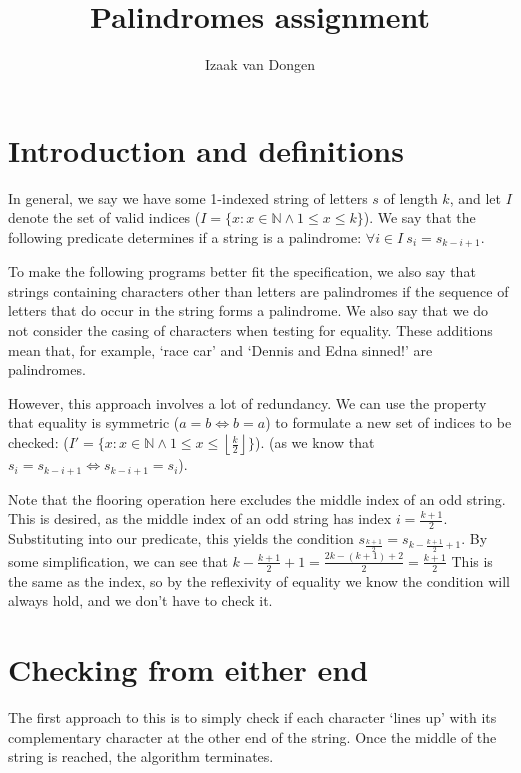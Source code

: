 \documentclass[fleqn,a4paper,11pt]{article}
\title{Palindromes assignment}
\author{Izaak van Dongen}
\begin{document}
    \maketitle
    \tableofcontents

    \section{Introduction and definitions}

    In general, we say we have some 1-indexed string of letters \(s\) of length
    \(k\), and let \(I\) denote the set of valid indices
    (\(I = \{x: x \in \mathbb{N} \land 1 \leq x \leq k\}\)).
    We say that the following predicate determines if a string is a palindrome:
    \( \forall i \in I\ s_i = s_{k - i + 1} \).

    To make the following programs better fit the specification, we also say
    that strings containing characters other than letters are palindromes if
    the sequence of letters that do occur in the string forms a palindrome. We
    also say that we do not consider the casing of characters when testing for
    equality. These additions mean that, for example, `race car' and `Dennis
    and Edna sinned!' are palindromes.

    However, this approach involves a lot of redundancy. We can use the
    property that equality is symmetric (\(a = b \iff b = a\)) to formulate a new
    set of indices to be checked:
    (\(I' = \{x: x \in \mathbb{N} \land 1 \leq x \leq
        \left\lfloor \frac{k}{2} \right\rfloor\}\)).
    (as we know that \( s_i = s_{k - i + 1} \iff s_{k - i + 1} = s_i \)).

    Note that the flooring operation here excludes the middle index of an odd
    string. This is desired, as the middle index of an odd string has index
    \( i = \frac{k + 1}{2} \). Substituting into our predicate, this yields the
    condition
    \( s_{\frac{k + 1}{2}} = s_{k - \frac{k + 1}{2} + 1} \).
    By some simplification, we can see that
    \( k - \frac{k + 1}{2} + 1 = \frac{2k - (k + 1) + 2}{2} = \frac{k + 1}{2} \)
    This is the same as the index, so by the reflexivity of equality we know
    the condition will always hold, and we don't have to check it.

    \section{Checking from either end}

    The first approach to this is to simply check if each character `lines up'
    with its complementary character at the other end of the string. Once the
    middle of the string is reached, the algorithm terminates.
\end{document}

